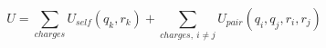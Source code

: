 \begin{equation}
U = \sum_{charges}U_{self}(q_k,r_k) + \sum_{charges,\ i \ne j}U_{pair}(q_i,q_j,r_i,r_j)
\end{equation}

